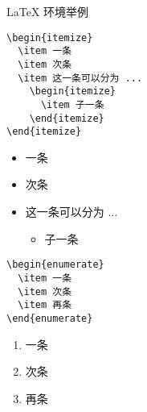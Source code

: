 \begin{frame}[fragile]{\LaTeX{} 环境举例}
  \begin{minipage}{0.4\linewidth}
    \begin{lstlisting}[basicstyle=\ttfamily\small]
\begin{itemize}
  \item 一条
  \item 次条
  \item 这一条可以分为 ...
    \begin{itemize}
      \item 子一条
    \end{itemize}
\end{itemize}
\end{lstlisting}
  \end{minipage}\hspace{1.5cm}
  \begin{minipage}{0.4\linewidth}
    \begin{itemize}
      \item 一条
      \item 次条
      \item 这一条可以分为 ...
            \begin{itemize}
              \item 子一条
            \end{itemize}
    \end{itemize}
  \end{minipage}
  \medskip

  \begin{minipage}{0.4\linewidth}
    \begin{lstlisting}
\begin{enumerate}
  \item 一条
  \item 次条
  \item 再条
\end{enumerate}
\end{lstlisting}
  \end{minipage}\hspace{1.5cm}
  \begin{minipage}{0.4\linewidth}
    \begin{enumerate}
      \item 一条
      \item 次条
      \item 再条
    \end{enumerate}
  \end{minipage}
\end{frame}
%

